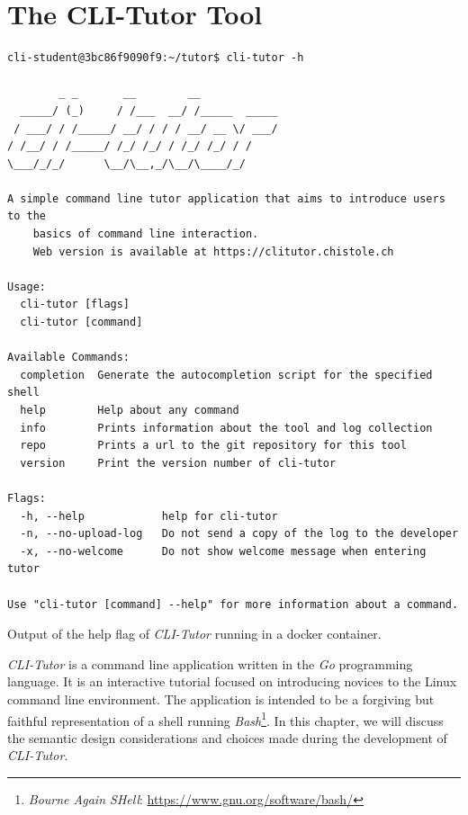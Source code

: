 \chapter{The CLI-Tutor Tool}
%
\label{chap:clitutor}
\begin{listing}[htbp]
\begin{verbatim}
cli-student@3bc86f9090f9:~/tutor$ cli-tutor -h

        _ _       __        __
  _____/ (_)     / /___  __/ /_____  _____
 / ___/ / /_____/ __/ / / / __/ __ \/ ___/
/ /__/ / /_____/ /_/ /_/ / /_/ /_/ / /
\___/_/_/      \__/\__,_/\__/\____/_/

A simple command line tutor application that aims to introduce users to the
    basics of command line interaction.
    Web version is available at https://clitutor.chistole.ch

Usage:
  cli-tutor [flags]
  cli-tutor [command]

Available Commands:
  completion  Generate the autocompletion script for the specified shell
  help        Help about any command
  info        Prints information about the tool and log collection
  repo        Prints a url to the git repository for this tool
  version     Print the version number of cli-tutor

Flags:
  -h, --help            help for cli-tutor
  -n, --no-upload-log   Do not send a copy of the log to the developer
  -x, --no-welcome      Do not show welcome message when entering tutor

Use "cli-tutor [command] --help" for more information about a command.
\end{verbatim}
\caption{Output of the help flag of \textit{CLI-Tutor} running in a docker container.}
\label{lst:clihelp}
\end{listing}
\clearpage

\textit{CLI-Tutor} is a command line application written in the \textit{Go}
programming language. It is an interactive tutorial focused on introducing
novices to the Linux command line environment. The application is intended to
be a forgiving but faithful representation of a shell running
\textit{Bash}\footnote{\textit{Bourne Again SHell}:
\url{https://www.gnu.org/software/bash/}}. In this chapter, we will discuss the
semantic design considerations and choices made during the development of
\textit{CLI-Tutor}.

